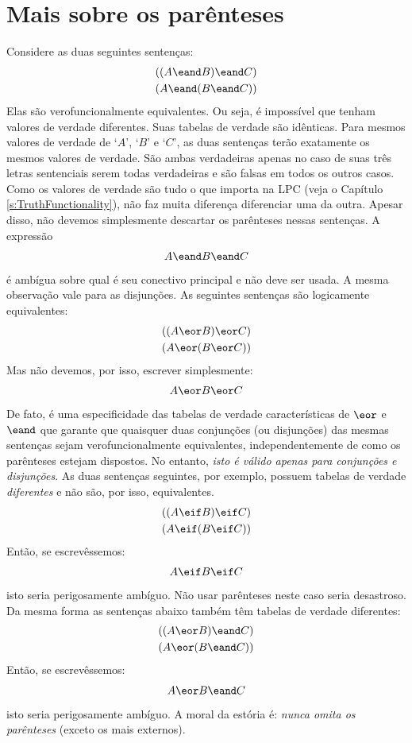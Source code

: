 \section{Mais sobre os parênteses}\label{s:MoreBracketingConventions}
Considere as duas seguintes sentenças:
	\begin{align*}
		((A \eand B) \eand C)\\
		(A \eand (B \eand C))
	\end{align*}
Elas são verofuncionalmente equivalentes.
Ou seja, é impossível que tenham valores de verdade diferentes.
Suas tabelas de verdade são idênticas.
Para mesmos valores de verdade de `$A$', `$B$' e `$C$', as duas sentenças terão exatamente os mesmos valores de verdade.
São ambas verdadeiras apenas no caso de suas três letras sentenciais serem todas verdadeiras e são falsas em todos os outros casos.
Como os valores de verdade são tudo o que importa na LPC (veja o Capítulo \ref{s:TruthFunctionality}), não faz muita diferença diferenciar uma da outra.
Apesar disso, não devemos simplesmente descartar os parênteses nessas sentenças.
A expressão
	\begin{align*}
		A \eand B \eand C
	\end{align*}
é ambígua sobre qual é seu conectivo principal e não deve ser usada.
A mesma observação vale para as disjunções.
As seguintes sentenças são logicamente equivalentes:
	\begin{align*}
		((A \eor B) \eor C)\\
		(A \eor (B \eor C))
	\end{align*}
Mas não devemos, por isso, escrever simplesmente:
	\begin{align*}
		A \eor B \eor C
	\end{align*}
De fato, é uma especificidade das tabelas de verdade características de $\eor$ e $\eand$ que garante que quaisquer duas conjunções (ou disjunções) das mesmas sentenças sejam verofuncionalmente equivalentes, independentemente de como os parênteses estejam dispostos.
No entanto, \emph{isto é válido apenas para conjunções e disjunções}.
As duas sentenças seguintes, por exemplo, possuem tabelas de verdade \emph{diferentes} e não são, por isso, equivalentes.
	\begin{align*}
		((A \eif B) \eif C)\\
		(A \eif (B \eif C))
	\end{align*}
Então, se escrevêssemos:
	\begin{align*}
		A \eif B \eif C
	\end{align*}
isto seria perigosamente ambíguo.
Não usar parênteses neste caso seria desastroso.
Da mesma forma as sentenças abaixo também têm tabelas de verdade diferentes:
	\begin{align*}
		((A \eor B) \eand C)\\
		(A \eor (B \eand C))
	\end{align*}
Então, se escrevêssemos:
	\begin{align*}
		A \eor B \eand C
	\end{align*}
isto seria perigosamente ambíguo.
A moral da estória é: \emph{nunca omita os parênteses} (exceto os mais externos).


